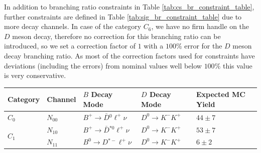 In addition to branching ratio constraints in Table \ref{tab:cs_br_constraint_table}, further constraints are defined in Table \ref{tab:sig_br_constraint_table} due to more decay channels. In case of the category $C_6$, we have no firm handle on the $D$ meson decay, therefore no correction for this branching ratio can be introduced, so we set a correction factor of $1$ with a $100\%$ error for the $D$ meson decay branching ratio. As most of the correction factors used for constraints have deviations (including the errors) from nominal values well below $100\%$ this value is very conservative.


\begin{table}[H]
	\centering
	\begin{tabular}{l|l|l|l|l}
		Category & Channel & $B$ Decay Mode & $D$ Decay Mode & Expected MC Yield \\
		\toprule
		
		$C_0$ & $N_{00}$ &  $B^+ \to \bar D {}^{0} \ell^+ \nu$ & $D^0 \to K^-K^+$ & $44\pm7$\\
		\midrule
		
		\multirow{2}{*}{$C_1$} & $N_{10}$ & $B^+ \to \bar D {}^{*0} \ell^+ \nu$ & $D^0 \to K^-K^+$ & $53\pm7$\\
		& $N_{11}$ & $B^0 \to D {}^{*-} \ell^+ \nu$  & $D^0 \to K^-K^+$ & $6\pm2$\\
		\midrule
		

\end{tabular}
\end{table}
